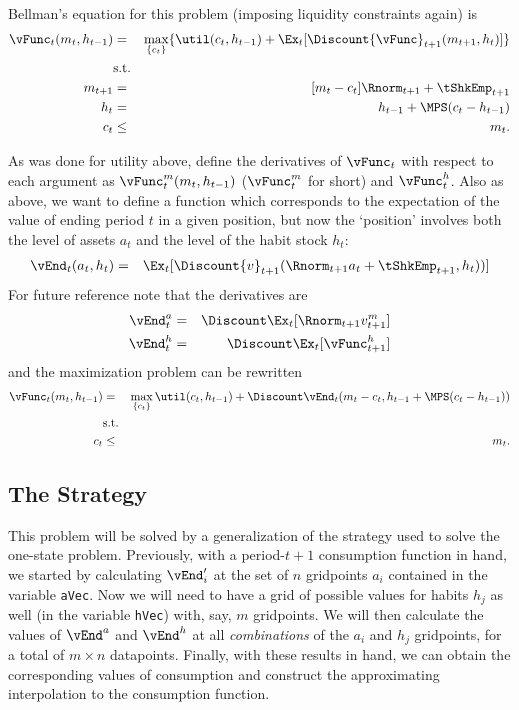 \documentclass[titlepage]{\econtex}
\begin{document}
{Bellman's equation for this problem (imposing liquidity constraints again) is
\begin{eqnarray}
{\vFunc}_{t}({m}_{t},h_{t-1}) & = & \max_{\{{c}_{t}\}}  \{\util({c}_{t},h_{t-1}) +
\Ex_{t}[\Discount  {\vFunc}_{t+1}({m}_{t+1},h_{t}) ]\}
\\ & \text{s.t.} & \nonumber \\
{m}_{t+1} & = & [{m}_{t}-{c}_{t}]\Rnorm_{t+1} + \tShkEmp_{t+1}\\
h_{t} &  = & h_{t-1} + \MPS ({c}_{t} - h_{t-1} ) \\
{c}_{t} & \leq & {m}_{t} .
\end{eqnarray}

As was done for utility above, define the derivatives of ${\vFunc}_{t}$ with
respect to each argument as ${\vFunc}_{t}^{m}({m}_{t},h_{t-1})$ (${\vFunc}_{t}^{m}$
for short) and ${\vFunc}_{t}^{h}$.  Also as above, we want to
define a function which corresponds to the expectation of the value of
ending period $t$ in a given position, but now the `position'
involves both the level of assets ${a}_{t}$ and the level of the habit
stock $h_{t}$:
\begin{eqnarray}
        \vEnd_{t}({a}_{t},h_{t}) & = & \Ex_{t}[\Discount {v}_{t+1}(\Rnorm_{t+1} {a}_{t}+{\tShkEmp}_{t+1},h_{t}))]
\end{eqnarray}
For future reference note that the derivatives are
\begin{eqnarray}
        \vEnd_{t}^{{a}} & = & \Discount \Ex_{t} [\Rnorm_{t+1} {v}_{t+1}^{m}] \label{eq:vEndsdefn} \\
        \vEnd_{t}^{h} & = & \Discount \Ex_{t} [{\vFunc}_{t+1}^{h}] \label{eq:vEndhdefn}
\end{eqnarray}
and the maximization problem can be rewritten
\begin{eqnarray}
{\vFunc}_{t}({m}_{t},h_{t-1}) & = &
  \max_{\{{c}_{t}\}} %
\util({c}_{t},h_{t-1})  +  \Discount
  \vEnd_{t}({m}_{t}-{c}_{t},h_{t-1}+\MPS({c}_{t}-h_{t-1}))
\\        & \text{s.t.} & \nonumber
\\  {c}_{t} & \leq & {m}_{t}.
\end{eqnarray}

\hypertarget{The-Strategy}{}
\subsection{The Strategy}

This problem will be solved by a generalization of the strategy used
to solve the one-state problem.  Previously, with a period-$t+1$
consumption function in hand, we started by calculating
$\vEnd^{\prime}_{i}$ at the set of $n$ gridpoints ${a}_{i}$
contained in the variable \texttt{aVec}.  Now we will need to
have a grid of possible values for habits $h_{j}$ as well (in the
variable \texttt{hVec}) with, say, $m$ gridpoints.  We will then
calculate the values of $\vEnd^{{a}}$ and $\vEnd^{h}$
at all \textit{combinations} of the ${a}_{i}$ and $h_{j}$
gridpoints, for a total of $m \times n$ datapoints.  Finally, with
these results in hand, we can obtain the corresponding values of
consumption and construct the approximating interpolation to the
consumption function.

}
\end{document}
